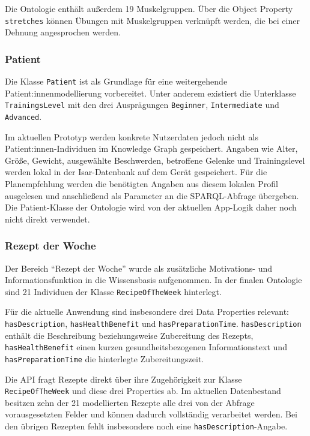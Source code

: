 Die Ontologie enthält außerdem 19 Muskelgruppen. Über die Object Property \texttt{stretches} können Übungen mit Muskelgruppen verknüpft werden, die bei einer Dehnung angesprochen werden.

\subsubsection{Patient}

Die Klasse \texttt{Patient} ist als Grundlage für eine weitergehende Patient:innenmodellierung vorbereitet. Unter anderem existiert die Unterklasse \texttt{TrainingsLevel} mit den drei Ausprägungen \texttt{Beginner}, \texttt{Intermediate} und \texttt{Advanced}.

Im aktuellen Prototyp werden konkrete Nutzerdaten jedoch nicht als Patient:innen-Individuen im Knowledge Graph gespeichert. Angaben wie Alter, Größe, Gewicht, ausgewählte Beschwerden, betroffene Gelenke und Trainingslevel werden lokal in der Isar-Datenbank auf dem Gerät gespeichert. Für die Planempfehlung werden die benötigten Angaben aus diesem lokalen Profil ausgelesen und anschließend als Parameter an die SPARQL-Abfrage übergeben. Die Patient-Klasse der Ontologie wird von der aktuellen App-Logik daher noch nicht direkt verwendet.

\subsubsection{Rezept der Woche}

Der Bereich ``Rezept der Woche'' wurde als zusätzliche Motivations- und Informationsfunktion in die Wissensbasis aufgenommen. In der finalen Ontologie sind 21 Individuen der Klasse \texttt{RecipeOfTheWeek} hinterlegt.

Für die aktuelle Anwendung sind insbesondere drei Data Properties relevant: \texttt{hasDescription}, \texttt{hasHealthBenefit} und \texttt{hasPreparationTime}. \texttt{hasDescription} enthält die Beschreibung beziehungsweise Zubereitung des Rezepts, \texttt{hasHealthBenefit} einen kurzen gesundheitsbezogenen Informationstext und \texttt{hasPreparationTime} die hinterlegte Zubereitungszeit.

Die API fragt Rezepte direkt über ihre Zugehörigkeit zur Klasse \texttt{RecipeOfTheWeek} und diese drei Properties ab. Im aktuellen Datenbestand besitzen zehn der 21 modellierten Rezepte alle drei von der Abfrage vorausgesetzten Felder und können dadurch vollständig verarbeitet werden. Bei den übrigen Rezepten fehlt insbesondere noch eine \texttt{hasDescription}-Angabe.


